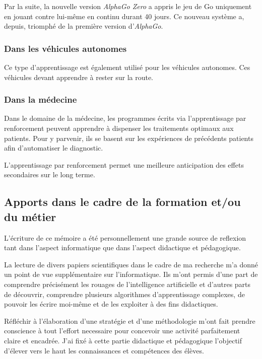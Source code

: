 \documentclass[
12pt,
french,
]{article}
\begin{document}
Par la suite, la nouvelle version \emph{AlphaGo Zero} a appris le jeu de
Go uniquement en jouant contre lui-même en continu durant 40 jours. Ce
nouveau système a, depuis, triomphé de la première version
d'\emph{AlphaGo}.

\hypertarget{dans-les-vuxe9hicules-autonomes}{%
\subsubsection{Dans les véhicules
autonomes}\label{dans-les-vuxe9hicules-autonomes}}

Ce type d'apprentissage est également utilisé pour les véhicules
autonomes. Ces véhicules devant apprendre à rester sur la route.

\hypertarget{dans-la-muxe9decine}{%
\subsubsection{Dans la médecine}\label{dans-la-muxe9decine}}

Dans le domaine de la médecine, les programmes écrits via
l'apprentissage par renforcement peuvent apprendre à dispenser les
traitements optimaux aux patients. Pour y parvenir, ils se basent sur
les expériences de précédents patients afin d'automatiser le diagnostic.

L'apprentissage par renforcement permet une meilleure anticipation des
effets secondaires sur le long terme.

\hypertarget{apports-dans-le-cadre-de-la-formation-etou-du-muxe9tier}{%
\subsection{Apports dans le cadre de la formation et/ou du
métier}\label{apports-dans-le-cadre-de-la-formation-etou-du-muxe9tier}}

L'écriture de ce mémoire a été personnellement une grande source de
reflexion tant dans l'aspect informatique que dans l'aspect didactique
et pédagogique.

La lecture de divers papiers scientifiques dans le cadre de ma recherche
m'a donné un point de vue supplémentaire sur l'informatique. Ils m'ont
permis d'une part de comprendre précisément les rouages de
l'intelligence artificielle et d'autres parts de découvrir, comprendre
plusieurs algorithmes d'apprentissage complexes, de pouvoir les écrire
moi-même et de les exploiter à des fins didactiques.

Réfléchir à l'élaboration d'une stratégie et d'une méthodologie m'ont
fait prendre conscience à tout l'effort necessaire pour concevoir une
activité parfaitement claire et encadrée. J'ai fixé à cette partie
didactique et pédagogique l'objectif d'élever vers le haut les
connaissances et compétences des élèves.
\end{document}
